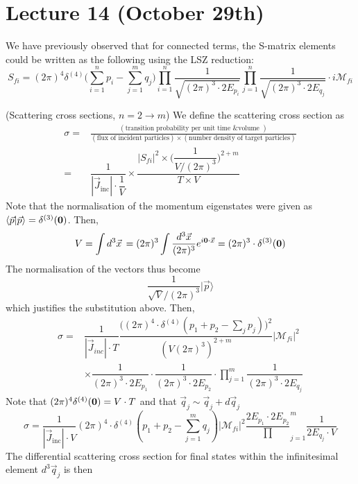 \section{Lecture 14 (October 29th)}
\begin{recall}
We have previously observed that for connected terms, the S-matrix elements could be written as the following using the LSZ reduction:
\[S_{fi}=(2\pi )^{4}\delta ^{(4)}\Big(\sum ^{n}_{i=1}p_{i}-\sum ^{m}_{j=1}q_{j}\Big)\prod^{n}_{i=1}\dfrac{1}{\sqrt{(2\pi )^3\cdot 2E_{p_{i}}}}\prod^{n}_{j=1}\dfrac{1}{\sqrt{(2\pi )^3\cdot 2E_{q_{j}}}}\cdot i\mathcal{M}_{fi}\]
\end{recall}
\vspace{2ex}
\begin{defi}
(Scattering cross sections, $n=2\rightarrow m$) We define the scattering cross section as 
\[\begin{align*}
\sigma =&\frac{(\text{transition probability per unit time \& volume })}{(\text{flux of incident particles}) \times (\text{number density of target particles})}\\
=&\dfrac{1}{|\vec{J}_{\mathrm{inc}}|\cdot \dfrac{1}{V}}\times \dfrac{|S_{fi}|^2\times \Big(\dfrac{1}{V/(2\pi )^3}\Big)^{2+m}}{T\times V}
\end{align*}\]
Note that the normalisation of the momentum eigenstates were given as $\langle \vec{p}|\vec{p}\rangle =\delta ^{(3)}({\bf 0})$. Then,
\[V=\int d^3\vec{x}\,=(2\pi )^3\int \dfrac{d^3\vec{x}}{(2\pi )^3}e^{i{\bf 0}\cdot \vec{x}}=(2\pi )^3\cdot \delta ^{(3)}({\bf 0})\]
The normalisation of the vectors thus become
\[\dfrac{1}{\sqrt{V}/(2\pi )^3}|\vec{p}\rangle \]
which justifies the substitution above. Then,
\[\begin{align*}
\sigma =&\dfrac{1}{|\vec{J}_{inc}|\cdot T}\dfrac{\Big((2\pi )^{4}\cdot \delta ^{(4)}(p_1+p_2-\sum _{j}p_{j})\Big)^2}{(V(2\pi )^3)^{2+m}}|\mathcal{M}_{fi}|^2\\
&\times \dfrac{1}{(2\pi )^3\cdot 2E_{p_1}}\cdot \dfrac{1}{(2\pi )^3\cdot 2E_{p_2}}\cdot \prod^{m}_{j=1}\dfrac{1}{(2\pi )^3\cdot 2E_{q_{j}}}
\end{align*}\]
Note that $(2\pi )^{4}\delta ^{(4)}({\bf 0})=V\cdot T$ and that $\vec{q}_{j}\sim \vec{q}_{j}+d\vec{q}_{j}$
\[\sigma =\dfrac{1}{|\vec{J}_{\mathrm{inc}}|\cdot V}(2\pi )^{4}\cdot \delta ^{(4)}(p_1+p_2-\sum ^{m}_{j=1}q_{j})|\mathcal{M}_{fi}|^2\dfrac{2E_{p_1}\cdot 2E_{p_2}}\prod^{m}_{j=1}\dfrac{1}{2E_{q_{j}}\cdot V}\]
The differential scattering cross section for final states within the infinitesimal element $d^3\vec{q}_{j}$ is then

\end{defi}
